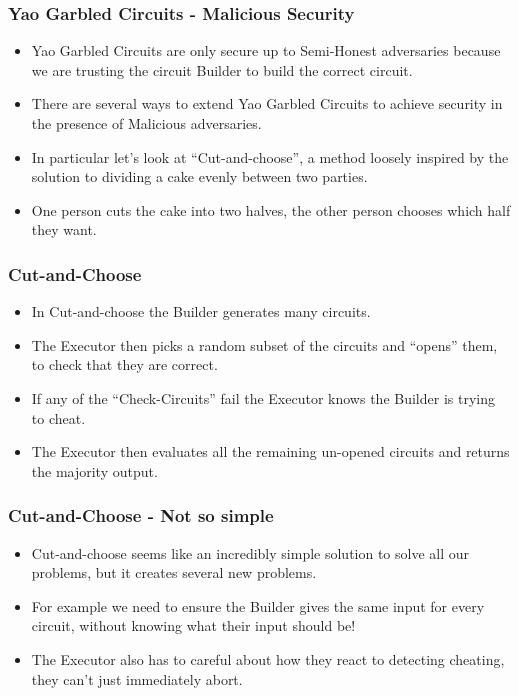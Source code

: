 \documentclass{beamer}
\begin{document}
	
	\begin{frame}
		\frametitle{Yao Garbled Circuits - Malicious Security}
		\begin{itemize}
			\item Yao Garbled Circuits are only secure up to Semi-Honest adversaries because we are trusting the circuit Builder to build the correct circuit.
			\item There are several ways to extend Yao Garbled Circuits to achieve security in the presence of Malicious adversaries.
			\item In particular let's look at ``Cut-and-choose'', a method loosely inspired by the solution to dividing a cake evenly between two parties.
			\item One person cuts the cake into two halves, the other person chooses which half they want.
		\end{itemize}

	\end{frame}

	
	\begin{frame}
		\frametitle{Cut-and-Choose}
		\begin{itemize}
			\item In Cut-and-choose the Builder generates many circuits.
			\item The Executor then picks a random subset of the circuits and ``opens'' them, to check that they are correct.
			\item If any of the ``Check-Circuits'' fail the Executor knows the Builder is trying to cheat.
			\item The Executor then evaluates all the remaining un-opened circuits and returns the majority output.
		\end{itemize}
	\end{frame}

	
	\begin{frame}
		\frametitle{Cut-and-Choose - Not so simple}
		\begin{itemize}
			\item Cut-and-choose seems like an incredibly simple solution to solve all our problems, but it creates several new problems.
			\item For example we need to ensure the Builder gives the same input for every circuit, without knowing what their input should be!
			\item The Executor also has to careful about how they react to detecting cheating, they can't just immediately abort.
		\end{itemize}
	\end{frame}
	
\end{document}
